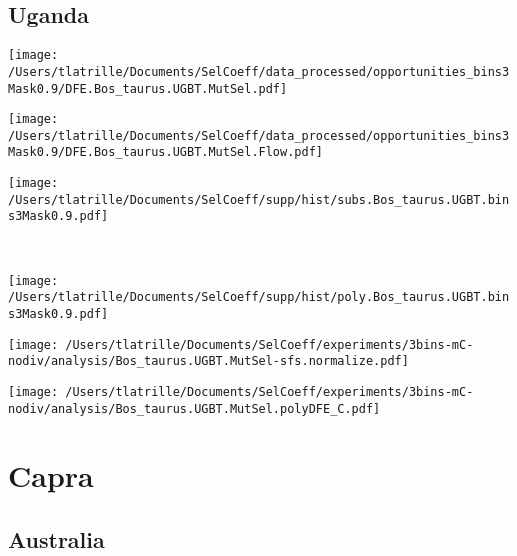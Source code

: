 \documentclass{article}
\begin{document}
    \subsection{Uganda}

    \begin{minipage}{0.32\linewidth}
        \texttt{[image: /Users/tlatrille/Documents/SelCoeff/data\_processed/opportunities\_bins3Mask0.9/DFE.Bos\_taurus.UGBT.MutSel.pdf]}
    \end{minipage}
    \begin{minipage}{0.32\linewidth}
        \texttt{[image: /Users/tlatrille/Documents/SelCoeff/data\_processed/opportunities\_bins3Mask0.9/DFE.Bos\_taurus.UGBT.MutSel.Flow.pdf]}
    \end{minipage}
    \begin{minipage}{0.32\linewidth}
        \texttt{[image: /Users/tlatrille/Documents/SelCoeff/supp/hist/subs.Bos\_taurus.UGBT.bins3Mask0.9.pdf]}
    \end{minipage}
    \\
    \begin{minipage}{0.32\linewidth}
        \texttt{[image: /Users/tlatrille/Documents/SelCoeff/supp/hist/poly.Bos\_taurus.UGBT.bins3Mask0.9.pdf]}
    \end{minipage}
    \begin{minipage}{0.32\linewidth}
        \texttt{[image: /Users/tlatrille/Documents/SelCoeff/experiments/3bins-mC-nodiv/analysis/Bos\_taurus.UGBT.MutSel-sfs.normalize.pdf]}
    \end{minipage}
    \begin{minipage}{0.32\linewidth}
        \texttt{[image: /Users/tlatrille/Documents/SelCoeff/experiments/3bins-mC-nodiv/analysis/Bos\_taurus.UGBT.MutSel.polyDFE\_C.pdf]}
    \end{minipage}
    \section{Capra}

    \subsection{Australia}
\end{document}
